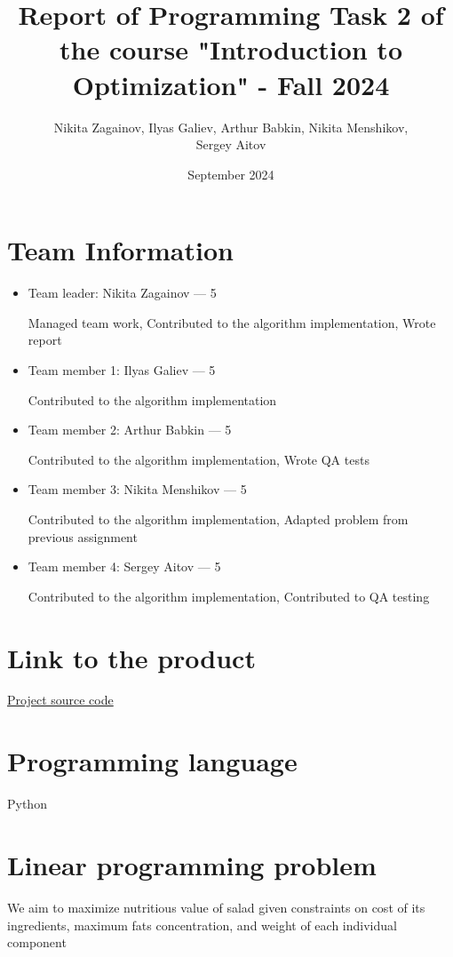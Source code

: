 \documentclass{article}
\title{Report of Programming Task 2 of the course "Introduction to Optimization" - Fall 2024}
\author{Nikita Zagainov, Ilyas Galiev, Arthur Babkin, Nikita Menshikov, \\ Sergey Aitov}
\date{September 2024}
\begin{document}
\maketitle

\section{Team Information}
\noindent
\begin{itemize}
    \item Team leader: Nikita Zagainov --- 5

          Managed team work, Contributed to the algorithm implementation, Wrote report

    \item Team member 1: Ilyas Galiev --- 5

          Contributed to the algorithm implementation

    \item Team member 2: Arthur Babkin --- 5

          Contributed to the algorithm implementation, Wrote QA tests
    
          \item Team member 3: Nikita Menshikov --- 5

          Contributed to the algorithm implementation, Adapted problem from previous
          assignment

    \item Team member 4: Sergey Aitov --- 5

          Contributed to the algorithm implementation, Contributed to QA testing
\end{itemize}
\section{Link to the product}
\href{https://github.com/V1adych/interior-point}{Project source code}

\section{Programming language}
Python

\section{Linear programming problem}
We aim to maximize nutritious value of salad given constraints on cost of its
ingredients, maximum fats concentration, and weight of each individual
component
\end{document}
